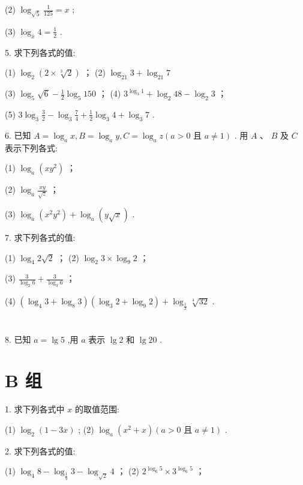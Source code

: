 \documentclass[10pt]{article}
\begin{document}
(2) \({\log }_{\sqrt{5}}\frac{1}{125} = x\) ;

(3) \({\log }_{x}4 = \frac{1}{2}\) .

5. 求下列各式的值:

(1) \({\log }_{2}\left( {2 \times  \sqrt[3]{2}}\right)\) ； (2) \({\log }_{21}3 + {\log }_{21}7\)

(3) \({\log }_{5}\sqrt{6} - \frac{1}{2}{\log }_{5}{150}\) ； (4) \({3}^{{\log }_{3}1} + {\log }_{2}{48} - {\log }_{2}3\) ；

(5) \(3{\log }_{3}\frac{3}{2} - {\log }_{3}\frac{7}{4} + \frac{1}{2}{\log }_{3}4 + {\log }_{3}7\) .

6. 已知 \(A = {\log }_{a}x,B = {\log }_{a}y,C = {\log }_{a}z\left( {a > 0\text{ 且 }a \neq  1}\right)\) . 用 \(A\text{ 、 }B\) 及 \(C\) 表示下列各式:

(1) \({\log }_{a}\left( {x{y}^{2}}\right)\) ；

(2) \({\log }_{a}\frac{xy}{\sqrt{z}}\) ；

(3) \({\log }_{a}\left( {{x}^{2}{y}^{2}}\right)  + {\log }_{a}\left( {y\sqrt{x}}\right)\) .

7. 求下列各式的值:

(1) \({\log }_{4}2\sqrt{2}\) ； (2) \({\log }_{2}3 \times  {\log }_{9}2\) ；

(3) \(\frac{3}{{\log }_{2}6} + \frac{3}{{\log }_{3}6}\) ；

(4) \(\left( {{\log }_{4}3 + {\log }_{8}3}\right) \left( {{\log }_{3}2 + {\log }_{9}2}\right)  + {\log }_{\frac{1}{2}}\sqrt[4]{32}\) .

\section*{}

8. 已知 \(a = \lg 5\) ,用 \(a\) 表示 \(\lg 2\) 和 \(\lg {20}\) .

\section*{B 组}

1. 求下列各式中 \(x\) 的取值范围:

(1) \({\log }_{2}\left( {1 - {3x}}\right)\) ; (2) \({\log }_{a}\left( {{x}^{2} + x}\right) \left( {a > 0\text{ 且 }a \neq  1}\right)\) .

2. 求下列各式的值:

(1) \({\log }_{4}8 - {\log }_{\frac{1}{9}}3 - {\log }_{\sqrt{2}}4\) ； (2) \({2}^{{\log }_{6}5} \times  {3}^{{\log }_{6}5}\) ；
\end{document}
